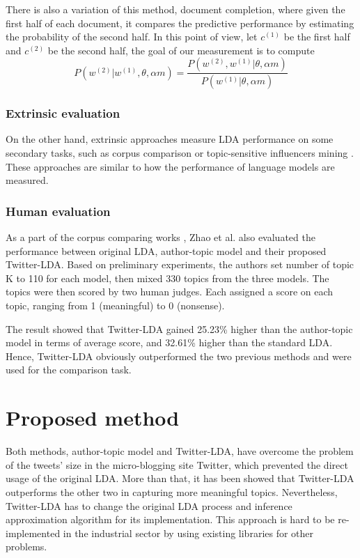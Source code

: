 \documentclass[11pt]{article}
\begin{document}
There is also a variation of this method, document completion, where given the first half of each document, it compares the predictive performance by estimating the probability of the second half. In this point of view, let $c^{(1)}$ be the first half and $c^{(2)}$ be the second half, the goal of our measurement is to compute
\[P(w^{(2)}|w^{(1)},\theta,\alpha m)=\frac{P(w^{(2)}, w^{(1)}|\theta,\alpha m)}{P(w^{(1)}|\theta,\alpha m)}\]

\subsubsection{Extrinsic evaluation}
On the other hand, extrinsic approaches measure LDA performance on some secondary tasks, such as corpus comparison \cite{zhao2011comparing} or topic-sensitive influencers mining \cite{Weng2010}. These approaches are similar to how the performance of language models are measured.

\subsubsection{Human evaluation}

As a part of the corpus comparing works \cite{zhao2011comparing}, Zhao et al. also evaluated the performance between original LDA, author-topic model and their proposed Twitter-LDA. Based on preliminary experiments, the authors set number of topic K to 110 for each model, then mixed 330 topics from the three models. The topics were then scored by two human judges. Each assigned a score on each topic, ranging from 1 (meaningful) to 0 (nonsense).

The result showed that Twitter-LDA gained 25.23\% higher than the author-topic model in terms of average score, and 32.61\% higher than the standard LDA. Hence, Twitter-LDA obviously outperformed the two previous methods and were used for the comparison task.


\section{Proposed method} \label{proposal}

Both methods, author-topic model and Twitter-LDA, have overcome the problem of the tweets' size in the micro-blogging site Twitter, which prevented the direct usage of the original LDA. More than that, it has been showed that Twitter-LDA outperforms the other two in capturing more meaningful topics. Nevertheless, Twitter-LDA has to change the original LDA process and inference approximation algorithm for its implementation. This approach is hard to be re-implemented in the industrial sector by using existing libraries for other problems.
\end{document}
